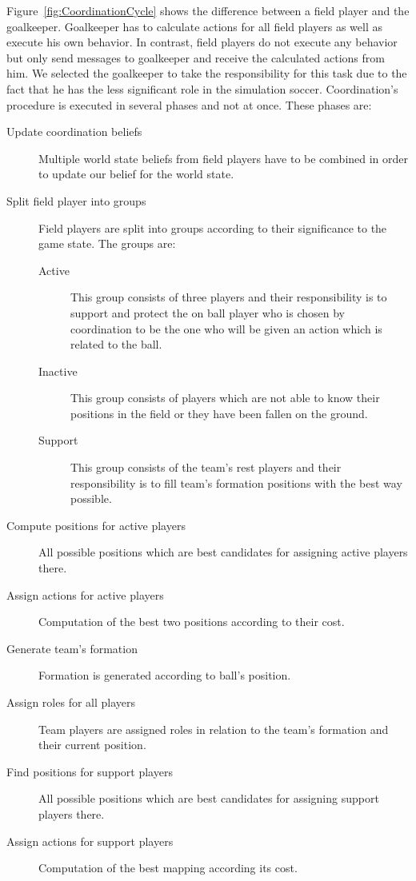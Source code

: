 Figure~\ref{fig:CoordinationCycle} shows the difference between a field player and the goalkeeper. Goalkeeper has to calculate actions for all field players as well as execute his own behavior. In contrast, field players do not execute any behavior but only send messages to goalkeeper and receive the calculated actions from him. We selected the goalkeeper to take the responsibility for this task due to the fact that he has the less significant role in the simulation soccer. Coordination's procedure is executed in several phases and not at once. These phases are:
\begin{description}
\item[Update coordination beliefs] Multiple world state beliefs from field players have to be combined in order to update our belief for the world state.
\item[Split field player into groups] Field players are split into groups according to their significance to the game state. The groups are:
\begin{description}
\item[Active] This group consists of three players and their responsibility is to support and protect the on ball player who is chosen by coordination to be the one who will be given an action which is related to the ball.
\item[Inactive] This group consists of players which are not able to know their positions in the field or they have been fallen on the ground.
\item[Support] This group consists of the team's rest players and their responsibility is to fill team's formation positions with the best way possible.
\end{description}
\item[Compute positions for active players] All possible positions which are best candidates for assigning active players there.
\item[Assign actions for active players] Computation of the best two positions according to their cost.
\item[Generate team's formation] Formation is generated according to ball's position.
\item[Assign roles for all players] Team players are assigned roles in relation to the team's formation and their current position.
\item[Find positions for support players] All possible positions which are best candidates for assigning support players there.
\item[Assign actions for support players] Computation of the best mapping  according its cost.
\end{description}


